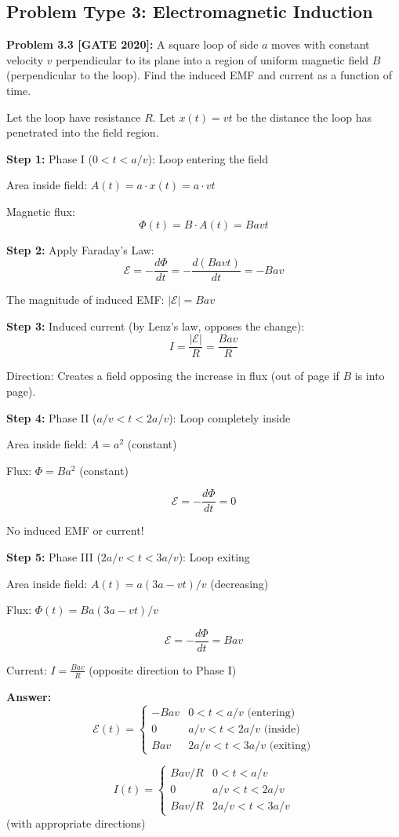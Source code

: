 \documentclass[12pt,a4paper]{article}
\begin{document}
\subsection{Problem Type 3: Electromagnetic Induction}

\textbf{Problem 3.3 [GATE 2020]:} A square loop of side $a$ moves with constant velocity $v$ perpendicular to its plane into a region of uniform magnetic field $B$ (perpendicular to the loop). Find the induced EMF and current as a function of time.

\begin{solution}
Let the loop have resistance $R$. Let $x(t) = vt$ be the distance the loop has penetrated into the field region.

\textbf{Step 1:} Phase I ($0 < t < a/v$): Loop entering the field

Area inside field: $A(t) = a \cdot x(t) = a \cdot vt$

Magnetic flux:
$$\Phi(t) = B \cdot A(t) = Bavt$$

\textbf{Step 2:} Apply Faraday's Law:
$$\mathcal{E} = -\frac{d\Phi}{dt} = -\frac{d(Bavt)}{dt} = -Bav$$

The magnitude of induced EMF: $|\mathcal{E}| = Bav$

\textbf{Step 3:} Induced current (by Lenz's law, opposes the change):
$$I = \frac{|\mathcal{E}|}{R} = \frac{Bav}{R}$$

Direction: Creates a field opposing the increase in flux (out of page if $B$ is into page).

\textbf{Step 4:} Phase II ($a/v < t < 2a/v$): Loop completely inside

Area inside field: $A = a^2$ (constant)

Flux: $\Phi = Ba^2$ (constant)

$$\mathcal{E} = -\frac{d\Phi}{dt} = 0$$

No induced EMF or current!

\textbf{Step 5:} Phase III ($2a/v < t < 3a/v$): Loop exiting

Area inside field: $A(t) = a(3a - vt)/v$ (decreasing)

Flux: $\Phi(t) = Ba(3a - vt)/v$

$$\mathcal{E} = -\frac{d\Phi}{dt} = Bav$$

Current: $I = \frac{Bav}{R}$ (opposite direction to Phase I)

\textbf{Answer:}
$$\mathcal{E}(t) = \begin{cases}
-Bav & 0 < t < a/v \text{ (entering)}\\
0 & a/v < t < 2a/v \text{ (inside)}\\
Bav & 2a/v < t < 3a/v \text{ (exiting)}
\end{cases}$$

$$I(t) = \begin{cases}
Bav/R & 0 < t < a/v \\
0 & a/v < t < 2a/v \\
Bav/R & 2a/v < t < 3a/v
\end{cases}$$
(with appropriate directions)
\end{solution}
\end{document}
